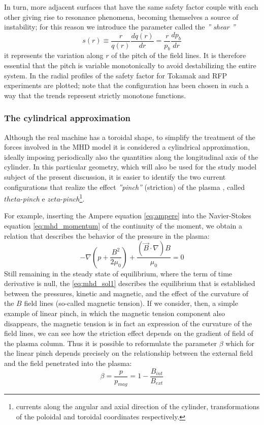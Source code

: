 In turn, more adjacent surfaces that have the same safety factor couple with each other giving rise to resonance phenomena, becoming themselves a source of instability; for this reason we introduce the parameter called the \emph{'' shear ''}
%
\begin{equation}
 s(r) \equiv \frac{r}{q(r)}\frac{dq(r)}{dr} = \frac{r}{p_b}\frac{dp_b}{dr}
\end{equation}
%
it represents the variation along $r$ of the pitch of the field lines. It is therefore essential that the pitch is variable monotonically to avoid destabilizing the entire system.
In \Figure{\ref{fig:profiles-tokarfp}} the radial profiles of the safety factor for Tokamak and RFP experiments are plotted; note that the configuration has been chosen in such a way that the trends represent strictly monotone functions.

\subsubsection{The cylindrical approximation}

Although the real machine has a toroidal shape, to simplify the treatment of the forces involved in the MHD model it is considered a cylindrical approximation, ideally imposing periodically also the quantities along the longitudinal axis of the cylinder. In this particular geometry, which will also be used for the study model subject of the present discussion, it is easier to identify the two current configurations that realize the effect \emph{''pinch''} (striction) of the plasma \cite{fridberg}\cite{ortolani}, called $theta$-\emph{pinch} e $zeta$-\emph{pinch}\footnote{currents along the angular and axial direction of the cylinder, transformations of the poloidal and toroidal coordinates respectively.}.

For example, inserting the Ampere equation \eqref{eq:ampere} into the Navier-Stokes equation \eqref{eq:mhd_momentum} of the continuity of the moment, we obtain a relation that describes the behavior of the pressure in the plasma:
\begin{equation}
 \label{eq:mhd_sol1}
 -\nabla \left( p+\frac{B^2}{2\mu_0} \right) + \frac{
  (\Vec{B}\cdot\nabla)B}{\mu_0} = 0
\end{equation}
Still remaining in the steady state of equilibrium, where the term of time derivative is null, the \eqref{eq:mhd_sol1} describes the equilibrium that is established between the pressures, kinetic and magnetic, and the effect of the curvature of the ${B}$ field lines (so-called magnetic tension). If we consider, then, a simple example of linear pinch, in which the magnetic tension component also disappears, the magnetic tension is in fact an expression of the curvature of the field lines, we can see how the striction effect depends on the gradient of field of the plasma column. Thus it is possible to reformulate the parameter $ \beta $ which for the linear pinch depends precisely on the relationship between the external field and the field penetrated into the plasma:
\begin{equation}
\beta = \frac{p}{p_{mag}} = 1-\frac{B_{int}}{B_{ext}}
\end{equation}

